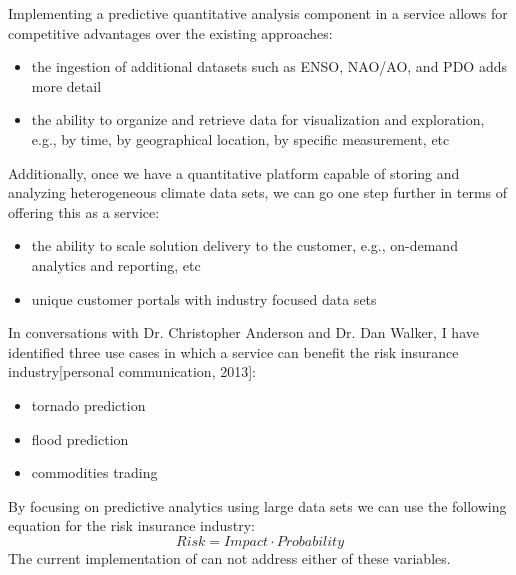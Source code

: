 Implementing a predictive quantitative analysis component in a \ce service allows for competitive advantages over the existing approaches:
\begin{itemize}
    \item{the ingestion of additional datasets such as \textsc{ENSO}, \textsc{NAO/AO}, and \textsc{PDO} adds more detail\cite[p. 1]{methods}}
    \item the ability to organize and retrieve data for visualization and exploration, e.g., by time, by geographical location, by specific measurement, etc
\end{itemize}
Additionally, once we have a quantitative platform capable of storing and analyzing heterogeneous climate data sets, we can go one step further in terms of offering this as a service:
\begin{itemize}
    \item{the ability to scale solution delivery to the customer, e.g., on-demand analytics and reporting, etc}
    \item{unique customer portals with industry focused data sets}
\end{itemize}
In conversations with Dr. Christopher Anderson and Dr. Dan Walker, I have identified three use cases in which a \ce service can benefit the risk insurance industry[personal communication, 2013]:
\begin{itemize}
    \item tornado prediction
    \item flood prediction
    \item commodities trading
\end{itemize}
By focusing on predictive analytics using large data sets we can use the following equation for the risk insurance industry:
\begin{equation*}
    Risk = Impact \cdot Probability
\end{equation*}
The current implementation of \climatedge can not address either of these variables.

\renewcommand\bibname{{References}}


